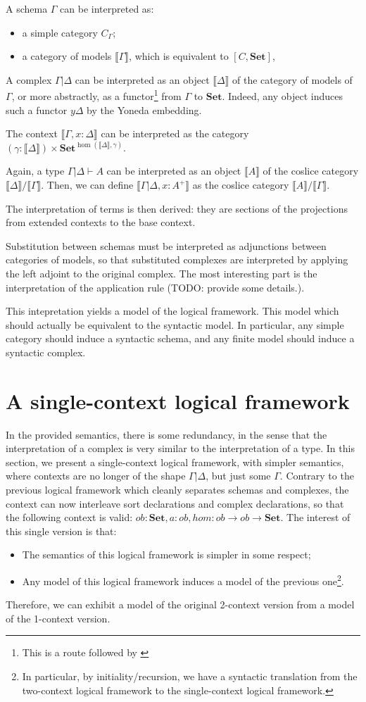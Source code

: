 \documentclass{article}
\begin{document}
A schema $Γ$ can be interpreted as:
\begin{itemize}
    \item a simple category $C_Γ$;
    \item a category of models $⟦Γ ⟧$, which is equivalent to $[C,𝐒𝐞𝐭]$,
\end{itemize}
A complex $Γ|Δ$ can be interpreted as an object $⟦Δ⟧$ of the category of models of $Γ$, or more abstractly, as a functor\footnote{This is a route followed by \cite{DBLP:journals/corr/AltenkirchCDF16}} from $Γ$ to $𝐒𝐞𝐭$. Indeed, any object induces such a functor $yΔ$ by the Yoneda embedding.


The context $⟦Γ,x:Δ ⟧$ can be interpreted 
as the category $(γ:⟦Δ⟧) × 𝐒𝐞𝐭^{\hom(⟦Δ⟧,γ)}$.

Again, a type $Γ | Δ ⊢ A$ can be interpreted as an object $⟦A⟧$ of the coslice category $⟦Δ⟧ / ⟦Γ⟧$.
Then, we can define  $⟦Γ|Δ,x:A^+⟧$ as the coslice category $⟦A ⟧ / ⟦Γ⟧$.


The interpretation of terms is then derived: they are sections of the projections from extended contexts to the base context.

Substitution between schemas must be interpreted as adjunctions between categories of models,
so that substituted complexes are interpreted by applying the left adjoint to the original complex.
The most interesting part is the interpretation of the application rule (TODO: provide some details.).

This intepretation yields a model of the logical framework. This model which should actually be equivalent to the syntactic model. In particular, any simple category should 
induce a syntactic schema, and any finite model should induce a syntactic complex.
\section{A single-context logical framework}

In the provided semantics, there is some redundancy, in the sense that the interpretation 
of a complex is very similar to the interpretation of a type. 
In this section, we present a single-context logical framework, with simpler semantics, where 
contexts are no longer of the shape $Γ|Δ$, but just some $Γ$.
Contrary to the previous logical framework which cleanly separates schemas and complexes,
the context can now interleave sort declarations and 
complex declarations, so that the following context is valid:
$ob:𝐒𝐞𝐭, a:ob, hom : ob → ob → 𝐒𝐞𝐭$.
The interest of this single version is that:
\begin{itemize}
    \item The semantics of this logical framework is simpler in some respect;
    \item Any model of this logical framework induces a model 
    of the previous one\footnote{In particular, by initiality/recursion, we have a syntactic translation from the two-context logical framework to the single-context logical framework.}.
\end{itemize}
Therefore, we can exhibit a model of the original 2-context version from a model of the 
1-context version.
\end{document}
